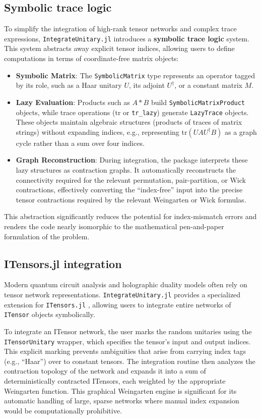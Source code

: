 \documentclass[manuscript,screen]{acmart}
\begin{document}
\subsection{Symbolic trace logic}
To simplify the integration of high-rank tensor networks and complex trace
expressions, \texttt{IntegrateUnitary.jl} introduces a \textbf{symbolic trace logic} system.
This system abstracts away explicit tensor indices, allowing users to define
computations in terms of coordinate-free matrix objects:
\begin{itemize}
    \item \textbf{Symbolic Matrix}: The \texttt{SymbolicMatrix} type represents
    an operator tagged by its role, such as a Haar unitary $U$, its adjoint
    $U^\dagger$, or a constant matrix $M$.
    \item \textbf{Lazy Evaluation}: Products such as $A * B$ build
    \texttt{SymbolicMatrixProduct} objects, while trace operations
    ($\mathrm{tr}$ or \texttt{tr\_lazy}) generate \texttt{LazyTrace} objects. These objects maintain
    algebraic structures (products of traces of matrix strings) without expanding
    indices, e.g., representing $\mathrm{tr}(U A U^\dagger B)$ as a graph cycle rather
    than a sum over four indices.
    \item \textbf{Graph Reconstruction}: During integration, the package
    interprets these lazy structures as contraction graphs. It automatically
    reconstructs the connectivity required for the relevant permutation,
    pair-partition, or Wick contractions, effectively converting the
    ``index-free'' input into the precise tensor contractions required by the
    relevant Weingarten or Wick formulas.
\end{itemize}
This abstraction significantly reduces the potential for index-mismatch errors
and renders the code nearly isomorphic to the mathematical pen-and-paper
formulation of the problem.

\subsection{ITensors.jl integration}
\label{sec:itensors}
Modern quantum circuit analysis and holographic duality models often rely on
tensor network representations. \texttt{IntegrateUnitary.jl} provides a specialized
extension for \texttt{ITensors.jl} \cite{fishman2022itensor}, allowing users to
integrate entire networks of \texttt{ITensor} objects symbolically.

To integrate an ITensor network, the user marks the random unitaries using the
\texttt{ITensorUnitary} wrapper, which specifies the tensor's input and output
indices. This explicit marking prevents ambiguities that arise from carrying
index tags (e.g., ``Haar'') over to constant tensors. The integration routine
then analyzes the contraction topology of the network and expands it into a sum
of deterministically contracted ITensors, each weighted by the appropriate
Weingarten function. This graphical Weingarten engine is significant for its
automatic handling of large, sparse networks where manual index expansion would
be computationally prohibitive.
\end{document}
